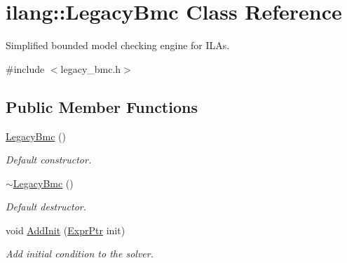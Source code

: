 \hypertarget{classilang_1_1_legacy_bmc}{}\section{ilang\+:\+:Legacy\+Bmc Class Reference}
\label{classilang_1_1_legacy_bmc}


Simplified bounded model checking engine for I\+L\+As.  




{\ttfamily \#include $<$legacy\+\_\+bmc.\+h$>$}

\subsection*{Public Member Functions}
\begin{DoxyCompactItemize}
\item 
\mbox{\label{classilang_1_1_legacy_bmc_ae521e48152acc2a79123ccf6020f037d}} 
\mbox{\hyperlink{classilang_1_1_legacy_bmc_ae521e48152acc2a79123ccf6020f037d}{Legacy\+Bmc}} ()
\begin{DoxyCompactList}\small\item\em Default constructor. \end{DoxyCompactList}\item 
\mbox{\label{classilang_1_1_legacy_bmc_a1841aa508b435631541a83f525f29193}} 
\mbox{\hyperlink{classilang_1_1_legacy_bmc_a1841aa508b435631541a83f525f29193}{$\sim$\+Legacy\+Bmc}} ()
\begin{DoxyCompactList}\small\item\em Default destructor. \end{DoxyCompactList}\item 
\mbox{\label{classilang_1_1_legacy_bmc_a5b23dfbfd4e89db6bba3baecee9228cc}} 
void \mbox{\hyperlink{classilang_1_1_legacy_bmc_a5b23dfbfd4e89db6bba3baecee9228cc}{Add\+Init}} (\mbox{\hyperlink{namespaceilang_a7c4196c72e53ea4df4b7861af7bc3bce}{Expr\+Ptr}} init)
\begin{DoxyCompactList}\small\item\em Add initial condition to the solver. \end{DoxyCompactList}\item 
\mbox{\label{classilang_1_1_legacy_bmc_a0e3603ca99e51e0d12786ce2386110e6}} 

\end{DoxyCompactItemize}
